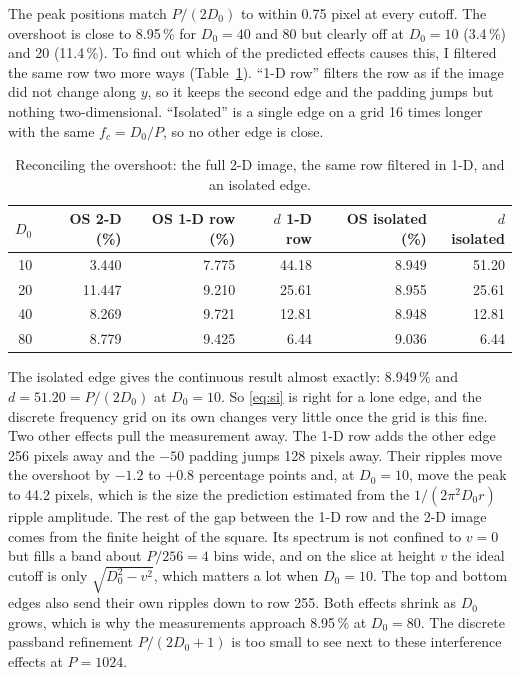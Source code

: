 The peak positions match $P/(2D_0)$ to within 0.75 pixel at every cutoff. The
overshoot is close to 8.95\,\% for $D_0=40$ and 80 but clearly off at $D_0=10$
(3.4\,\%) and 20 (11.4\,\%). To find out which of the predicted effects causes
this, I filtered the same row two more ways (Table~\ref{tab:recon}). ``1-D row''
filters the row as if the image did not change along $y$, so it keeps the second
edge and the padding jumps but nothing two-dimensional. ``Isolated'' is a single
edge on a grid 16 times longer with the same $f_c=D_0/P$, so no other edge is
close.

\begin{table}[H]
\centering
\begin{tabular}{rrrrrr}
\toprule
$D_0$ & OS 2-D (\%) & OS 1-D row (\%) & $d$ 1-D row & OS isolated (\%) & $d$ isolated\\
\midrule
10 & 3.440 & 7.775 & 44.18 & 8.949 & 51.20\\
20 & 11.447 & 9.210 & 25.61 & 8.955 & 25.61\\
40 & 8.269 & 9.721 & 12.81 & 8.948 & 12.81\\
80 & 8.779 & 9.425 & 6.44 & 9.036 & 6.44\\
\bottomrule
\end{tabular}
\caption{Reconciling the overshoot: the full 2-D image, the same row filtered in
1-D, and an isolated edge.}
\label{tab:recon}
\end{table}

The isolated edge gives the continuous result almost exactly: 8.949\,\% and
$d=51.20=P/(2D_0)$ at $D_0=10$. So \eqref{eq:si} is right for a lone edge, and
the discrete frequency grid on its own changes very little once the grid is
this fine. Two other effects pull the measurement away. The 1-D row adds the
other edge 256 pixels away and the $-50$ padding jumps 128 pixels away. Their
ripples move the overshoot by $-1.2$ to $+0.8$ percentage points and, at
$D_0=10$, move the peak to 44.2 pixels, which is the size the prediction
estimated from the $1/(2\pi^2D_0r)$ ripple amplitude. The rest of the gap
between the 1-D row and the 2-D image comes from the finite height of the
square. Its spectrum is not confined to $v=0$ but fills a band about
$P/256=4$ bins wide, and on the slice at height $v$ the ideal cutoff is only
$\sqrt{D_0^2-v^2}$, which matters a lot when $D_0=10$. The top and bottom edges
also send their own ripples down to row 255. Both effects shrink as $D_0$ grows,
which is why the measurements approach 8.95\,\% at $D_0=80$. The discrete
passband refinement $P/(2D_0+1)$ is too small to see next to these interference
effects at $P=1024$.

